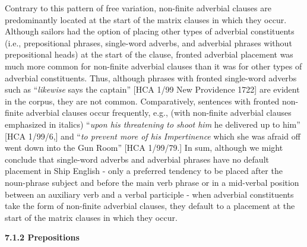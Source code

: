 \begin{styleStandard}
Contrary to this pattern of free variation, non-finite adverbial clauses are predominantly located at the start of the matrix clauses in which they occur. Although sailors had the option of placing other types of adverbial constituents (i.e., prepositional phrases, single-word adverbs, and adverbial phrases without prepositional heads) at the start of the clause, fronted adverbial placement was much more common for non-finite adverbial clauses than it was for other types of adverbial constituents. Thus, although phrases with fronted single-word adverbs such as “\textit{likewise }says the captain” [HCA 1/99 New Providence 1722] are evident in the corpus, they are not common. Comparatively, sentences with fronted non-finite adverbial clauses occur frequently, e.g., (with non-finite adverbial clauses emphasized in italics) “\textit{upon his threatening to shoot him} he delivered up to him” [HCA 1/99/6,] and “\textit{to prevent more of his Impertinence} which she was afraid off went down into the Gun Room” [HCA 1/99/79.] In sum, although we might conclude that single-word adverbs and adverbial phrases have no default placement in Ship English - only a preferred tendency to be placed after the noun-phrase subject and before the main verb phrase or in a mid-verbal position between an auxiliary verb and a verbal participle - when adverbial constituents take the form of non-finite adverbial clauses, they default to a placement at the start of the matrix clauses in which they occur. 
\end{styleStandard}

\begin{styleStandard}
\textbf{7.1.2 Prepositions }
\end{styleStandard}

